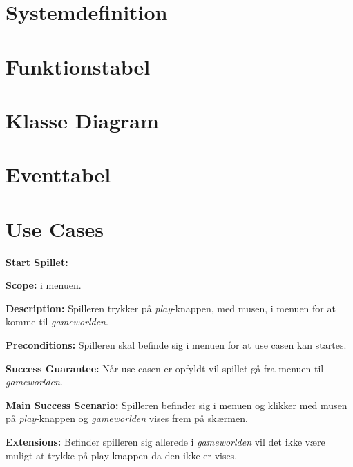 
\section{Systemdefinition}

\section{Funktionstabel}

\section{Klasse Diagram}

\section{Eventtabel}

\section{Use Cases}

\textbf{Start Spillet:}\newline

\textbf{Scope:}\newline
i menuen.\newline

\textbf{Description:} \newline
Spilleren trykker på \textit{play}-knappen, med musen, i menuen for at komme til \textit{gameworlden}. \newline

\textbf{Preconditions:}\newline
Spilleren skal befinde sig i menuen for at use casen kan startes.\newline

\textbf{Success Guarantee:}\newline
Når use casen er opfyldt vil spillet gå fra menuen til \textit{gameworlden}.\newline

\textbf{Main Success Scenario:}\newline
Spilleren befinder sig i menuen og klikker med musen på \textit{play}-knappen og \textit{gameworlden} vises frem på skærmen.\newline

\textbf{Extensions:}\newline
Befinder spilleren sig allerede i \textit{gameworlden} vil det ikke være muligt at trykke på play knappen da den ikke er vises.\newline \newline



